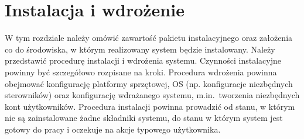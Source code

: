 \chapter{Instalacja i wdrożenie}
\thispagestyle{chapterBeginStyle}

W tym rozdziale należy omówić zawartość pakietu instalacyjnego oraz założenia co do środowiska, 
w którym realizowany system będzie instalowany. Należy przedstawić procedurę instalacji i wdrożenia 
systemu. Czynności instalacyjne powinny być szczegółowo rozpisane na kroki. Procedura wdrożenia 
powinna obejmować konfigurację platformy sprzętowej, OS (np. konfiguracje niezbędnych sterowników) 
oraz konfigurację wdrażanego systemu, m.in.\ tworzenia niezbędnych kont użytkowników. 
Procedura instalacji powinna prowadzić od stanu, w którym nie są zainstalowane żadne składniki systemu, 
do stanu w którym system jest gotowy do pracy i oczekuje na akcje typowego użytkownika.

